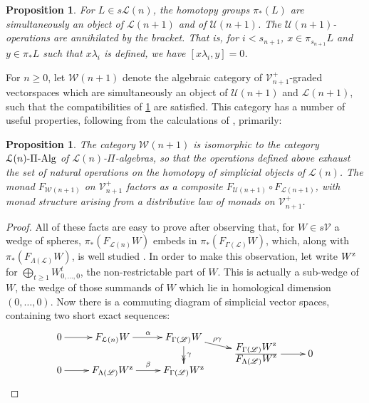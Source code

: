 \documentclass[11pt]{amsart}
\theoremstyle{plain}
\newtheorem{prop}[thm]{Proposition}
\theoremstyle{definition}
\newcommand{\scrL}{\mathscr{L}}
\newcommand{\calW}{\mathcal{W}}
\newcommand{\calU}{\mathcal{U}}
\newcommand{\calL}{\mathcal{L}}
\newcommand{\calV}{\mathcal{V}}
\theoremstyle{plain}
\newcommand{\LieOperad}{{\scrL}}
\newcommand{\vect}[2]{\calV^{#1}_{#2}}
\newcommand{\PiAlg}{\textup{-$\Pi$-Alg}}
\begin{document}
\begin{homotopy operations for PRLs}
\begin{prop}\label{compatibilities between U and L in W}
For $L\in s\calL(n)$, the homotopy groups $\pi_*(L)$ are simultaneously an object of $\calL(n+1)$ and of $\calU(n+1)$. The $\calU(n+1)$-operations are annihilated by the bracket. That is, for $i<s_{n+1}$, $x\in\pi_{s_{n+1}}L$ and $y\in \pi_*L$ such that $x\lambda_i$ is defined, we have $[x\lambda_i,y]=0$.
\end{prop}
For $n\geq0$, let $\calW(n+1)$ denote the algebraic category of $\vect{+}{n+1}$-graded vectorspaces which are simultaneously an object of $\calU(n+1)$ and $\calL(n+1)$, such that the compatibilities of \ref{compatibilities between U and L in W} are satisfied. This category has a number of useful properties, following from the calculations of \cite{6Author.pdf}, primarily:
\begin{prop}\label{prop on Wnplus1 being the pialgs for Wn}
The category $\calW(n+1)$ is isomorphic to the category $\calL(n)\PiAlg$ of $\calL(n)$-$\Pi$-algebras, so that the operations defined above exhaust the set of natural operations on the homotopy of simplicial objects of $\calL(n)$.
The monad $F_{\calW(n+1)}$ on $\vect{+}{n+1}$ factors as a composite $F_{\calU(n+1)}\circ F_{\calL(n+1)}$, with monad structure arising from a distributive law \cite{BeckDistLaws} of monads on $\vect{+}{n+1}$.
\end{prop}
\begin{proof}
All of these facts are easy to prove after observing that, for $W\in s\calV$ a wedge of spheres, $\pi_*(F_{\calL(n)}W)$ embeds in $\pi_*(F_{\Gamma(\LieOperad)}W)$, which, along with $\pi_*(F_{\Lambda(\LieOperad)}W)$, is well studied \cite{6Author.pdf}. In order to make this observation, let write $W^\textup{z}$ for $\bigoplus_{t\geq1}W_{0,\ldots,0}^t$, the non-restrictable part of $W$. This is actually a sub-wedge of $W$, the wedge of those summands of $W$ which lie in homological dimension $(0,\ldots,0)$. Now there is a commuting diagram of simplicial vector spaces, containing two short exact sequences:
\[\xymatrix@R=-2mm{
0
\ar[r]
&%
F_{\calL(n)}W
\ar[r]^{\alpha}
&%
F_{\Gamma(\LieOperad)}W
\ar[dr]^-(.4){\rho\gamma}\ar@{->>}[dd]^-{\gamma}
&%
\\%
&&&\frac{\displaystyle F_{\Gamma(\LieOperad)}W^\textup{z}}{\displaystyle F_{\Lambda(\LieOperad)}W^\textup{z}}
\ar[r]
&
0
\\
0
\ar[r]
&%
F_{\Lambda(\LieOperad)}W^\textup{z}
\ar[r]^{\beta}
&%
F_{\Gamma(\LieOperad)}W^\textup{z}
}\]
\end{proof}
\end{homotopy operations for PRLs}
\end{document}
